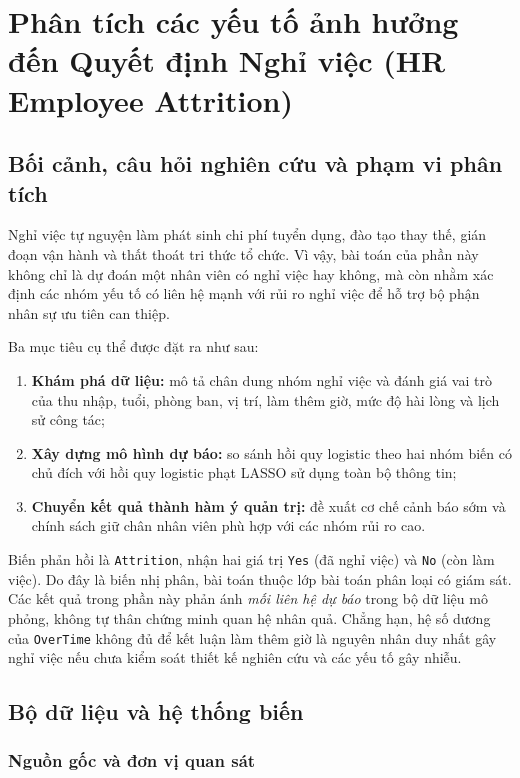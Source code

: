 \section{Phân tích các yếu tố ảnh hưởng đến Quyết định Nghỉ việc (HR Employee Attrition)}
\label{sec:hr-attrition}

\subsection{Bối cảnh, câu hỏi nghiên cứu và phạm vi phân tích}

Nghỉ việc tự nguyện làm phát sinh chi phí tuyển dụng, đào tạo thay thế,
gián đoạn vận hành và thất thoát tri thức tổ chức. Vì vậy, bài toán của
phần này không chỉ là dự đoán một nhân viên có nghỉ việc hay không, mà
còn nhằm xác định các nhóm yếu tố có liên hệ mạnh với rủi ro nghỉ việc
để hỗ trợ bộ phận nhân sự ưu tiên can thiệp.

Ba mục tiêu cụ thể được đặt ra như sau:

\begin{enumerate}
  \item \textbf{Khám phá dữ liệu:} mô tả chân dung nhóm nghỉ việc và
  đánh giá vai trò của thu nhập, tuổi, phòng ban, vị trí, làm thêm giờ,
  mức độ hài lòng và lịch sử công tác;
  \item \textbf{Xây dựng mô hình dự báo:} so sánh hồi quy logistic theo
  hai nhóm biến có chủ đích với hồi quy logistic phạt LASSO sử dụng toàn bộ thông tin;
  \item \textbf{Chuyển kết quả thành hàm ý quản trị:} đề xuất cơ chế
  cảnh báo sớm và chính sách giữ chân nhân viên phù hợp với các nhóm rủi ro cao.
\end{enumerate}

Biến phản hồi là \texttt{Attrition}, nhận hai giá trị \texttt{Yes}
(đã nghỉ việc) và \texttt{No} (còn làm việc). Do đây là biến nhị phân,
bài toán thuộc lớp bài toán phân loại có giám sát. Các kết quả trong
phần này phản ánh \emph{mối liên hệ dự báo} trong bộ dữ liệu mô phỏng,
không tự thân chứng minh quan hệ nhân quả. Chẳng hạn, hệ số dương của
\texttt{OverTime} không đủ để kết luận làm thêm giờ là nguyên nhân duy
nhất gây nghỉ việc nếu chưa kiểm soát thiết kế nghiên cứu và các yếu tố
gây nhiễu.

\subsection{Bộ dữ liệu và hệ thống biến}

\subsubsection{Nguồn gốc và đơn vị quan sát}


